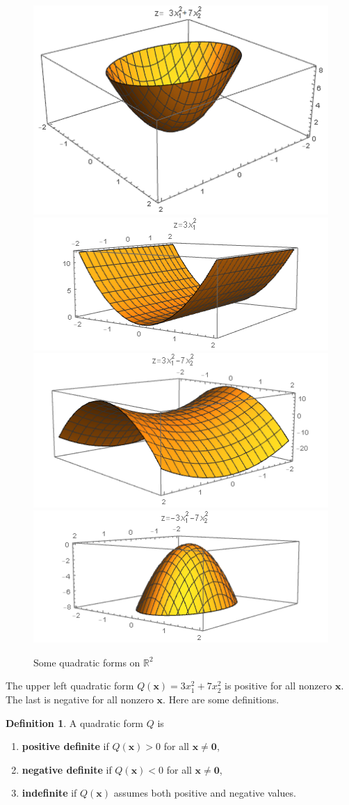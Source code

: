 \documentclass[
]{book}
\theoremstyle{definition}
\newtheorem{definition}{Definition}[chapter]
\theoremstyle{definition}
\theoremstyle{definition}
\theoremstyle{definition}
\theoremstyle{remark}
\begin{document}
\begin{figure}

{\centering \includegraphics[width=0.4\linewidth]{images/qf3a} \includegraphics[width=0.4\linewidth]{images/qf3b} \includegraphics[width=0.4\linewidth]{images/qf3c} \includegraphics[width=0.4\linewidth]{images/qf3d} 

}

\caption{Some quadratic forms on $\mathbb{R}^2$}\label{fig:qf1}
\end{figure}

The upper left quadratic form \(Q(\mathbf{x})=3x_1^2+7x_2^2\) is positive for all nonzero \(\mathbf{x}.\) The last is negative for all nonzero \(\mathbf{x}.\) Here are some definitions.

\begin{defbox}

\begin{definition}

A quadratic form \(Q\) is

\begin{enumerate}
\def\labelenumi{\arabic{enumi}.}
\item
  \textbf{positive definite} if \(Q(\mathbf{x})>0\) for all \(\mathbf{x}\neq \mathbf{0}\),
\item
  \textbf{negative definite} if \(Q(\mathbf{x})<0\) for all \(\mathbf{x}\neq \mathbf{0}\),
\item
  \textbf{indefinite} if \(Q(\mathbf{x})\) assumes both positive and negative values.
\end{enumerate}

\end{definition}

\end{defbox}
\end{document}
